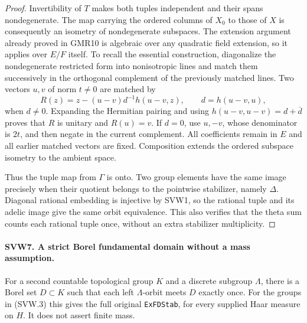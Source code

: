 \documentclass[11pt,a4paper]{article}
\numberwithin{equation}{section}
\theoremstyle{remark}\newtheorem{remark}[theorem]{Remark}
\begin{document}
\begin{proof}
Invertibility of $T$ makes both tuples independent and their spans
nondegenerate.  The map carrying the ordered columns of $X_0$ to
those of $X$ is consequently an isometry of nondegenerate
subspaces.  The extension argument already proved in GMR10 is
algebraic over any quadratic field extension, so it applies over
$E/F$ itself.  To recall the essential construction, diagonalize
the nondegenerate restricted form into nonisotropic lines and match
them successively in the orthogonal complement of the previously
matched lines.  Two vectors $u,v$ of norm $t\ne0$ are matched by
\[
 R(z)=z-(u-v)d^{-1}h(u-v,z),\qquad d=h(u-v,u),
 \tag{SVW.13}
\]
when $d\ne0$.  Expanding the Hermitian pairing and using
$h(u-v,u-v)=d+\overline d$ proves that $R$ is unitary and
$R(u)=v$.  If $d=0$, use $u,-v$, whose denominator is $2t$, and
then negate in the current complement.  All coefficients remain
in $E$ and all earlier matched vectors are fixed.  Composition
extends the ordered subspace isometry to the ambient space.

Thus the tuple map from $\Gamma$ is onto.  Two group elements have
the same image precisely when their quotient belongs to the
pointwise stabilizer, namely $\Delta$.  Diagonal rational embedding
is injective by SVW1, so the rational tuple and its adelic image
give the same orbit equivalence.  This also verifies that the
theta sum counts each rational tuple once, without an extra
stabilizer multiplicity.
\end{proof}

\paragraph{SVW7. A strict Borel fundamental domain without a mass assumption.}
\label{claim:SVW7}
For a second countable topological group $K$ and a discrete subgroup
$\Lambda$, there is a Borel set $D\subset K$ such that each left
$\Lambda$-orbit meets $D$ exactly once.  For the groups in (SVW.3)
this gives the full original \texttt{Ex\allowbreak FDStab}, for every supplied
Haar measure on $H$.  It does not assert finite mass.
\end{document}
